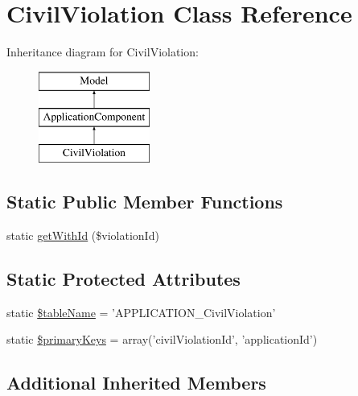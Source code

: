 \hypertarget{class_civil_violation}{\section{Civil\-Violation Class Reference}
\label{class_civil_violation}
}
Inheritance diagram for Civil\-Violation\-:\begin{figure}[H]
\begin{center}
\leavevmode
\includegraphics[height=3.000000cm]{class_civil_violation}
\end{center}
\end{figure}
\subsection*{Static Public Member Functions}
\begin{DoxyCompactItemize}
\item 
static \hyperlink{class_civil_violation_a47145663801ba80cb40261bbfbc75452}{get\-With\-Id} (\$violation\-Id)
\end{DoxyCompactItemize}
\subsection*{Static Protected Attributes}
\begin{DoxyCompactItemize}
\item 
static \hyperlink{class_civil_violation_ab18a4b699399e56d2b240f643ca540d9}{\$table\-Name} = 'A\-P\-P\-L\-I\-C\-A\-T\-I\-O\-N\-\_\-\-Civil\-Violation'
\item 
static \hyperlink{class_civil_violation_a95bf8aa53f022e88bf25660e78a9d14b}{\$primary\-Keys} = array('civil\-Violation\-Id', 'application\-Id')
\end{DoxyCompactItemize}
\subsection*{Additional Inherited Members}


